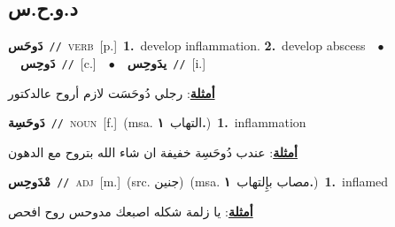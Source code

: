 \documentclass[10pt,a4paper,twoside]{article} %
\begin{document}
\begin{multicols}{2}
\vspace{-3mm}
\subsection*{\color{blue}\foreignlanguage{arabic}{د.و.ح.س}\color{blue}{}} 

{\setlength\topsep{0pt}\textbf{\foreignlanguage{arabic}{دَوحَس}}\ {\color{gray}\texttt{//}\color{black}}\ \textsc{verb}\ [p.]\ \textbf{1.}~develop inflammation.  \textbf{2.}~develop abscess\ \ $\bullet$\ \ \setlength\topsep{0pt}\textbf{\foreignlanguage{arabic}{دَوحِس}}\ {\color{gray}\texttt{//}\color{black}}\ [c.]\ \ $\bullet$\ \ \setlength\topsep{0pt}\textbf{\foreignlanguage{arabic}{يدَوحِس}}\ {\color{gray}\texttt{//}\color{black}}\ [i.]\  \begin{flushright}\color{gray}\foreignlanguage{arabic}{\textbf{\underline{\foreignlanguage{arabic}{أمثلة}}}: رجلي دُوحَسَت لازم أروح عالدكتور}\end{flushright}\color{black}} \vspace{2mm}

{\setlength\topsep{0pt}\textbf{\foreignlanguage{arabic}{دَوحَسِة}}\ {\color{gray}\texttt{//}\color{black}}\ \textsc{noun}\ [f.]\ \color{gray}(msa. \foreignlanguage{arabic}{التهاب}~\foreignlanguage{arabic}{\textbf{١.}})\color{black}\ \textbf{1.}~inflammation\  \begin{flushright}\color{gray}\foreignlanguage{arabic}{\textbf{\underline{\foreignlanguage{arabic}{أمثلة}}}: عندب دُوحَسِة خفيفة ان شاء الله بتروح مع الدهون}\end{flushright}\color{black}} \vspace{2mm}

{\setlength\topsep{0pt}\textbf{\foreignlanguage{arabic}{مْدَوحِس}}\ {\color{gray}\texttt{//}\color{black}}\ \textsc{adj}\ [m.]\ (src. \color{gray}\foreignlanguage{arabic}{جنين}\color{black})\ \color{gray}(msa. \foreignlanguage{arabic}{مصاب بإِلتهاب}~\foreignlanguage{arabic}{\textbf{١.}})\color{black}\ \textbf{1.}~inflamed\  \begin{flushright}\color{gray}\foreignlanguage{arabic}{\textbf{\underline{\foreignlanguage{arabic}{أمثلة}}}: يا زلمة شكله اصبعك مدوحس روح افحص}\end{flushright}\color{black}} \vspace{2mm}


\end{multicols}
\end{document}
